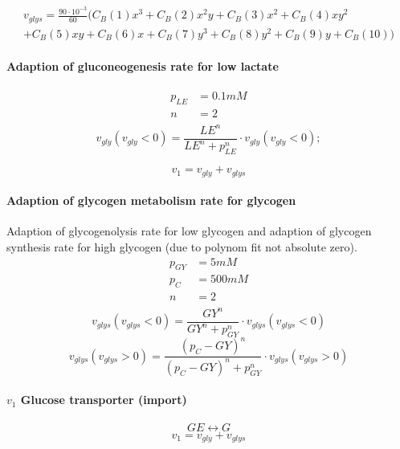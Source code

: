 \begin{landscape}
\begin{multicols}{2}
\begin{multline}
v_{glys} =\frac{90\cdot10^{-3}}{60} ( C_B(1)x^3 + C_B(2)x^2y + C_B(3)x^2 + C_B(4)xy^2\\
	  + C_B(5)xy+C_B(6)x + C_B(7)y^3 + C_B(8)y^2 + C_B(9)y + C_B(10))    
\end{multline}

\paragraph{Adaption of gluconeogenesis rate for low lactate}
\begin{align*}
p_{LE} &= 0.1 \unit{mM} \\
n  &= 2\\
\end{align*}
\begin{equation}
v_{gly}(v_{gly}<0) = \frac{LE^n}{LE^n + p_{LE}^n} \cdot v_{gly}(v_{gly}<0);
\end{equation}

\begin{equation}
v_1 = v_{gly} + v_{glys}
\label{eq: v1}
\end{equation}


\paragraph{Adaption of glycogen metabolism rate for glycogen}
Adaption of glycogenolysis rate for low glycogen and adaption of glycogen synthesis rate for high glycogen (due to polynom fit not absolute zero).
\begin{align*}
p_{GY} &= 5 \unit{mM} \\
p_{C} &= 500 \unit{mM} \\
n  &= 2\\
\end{align*}
\begin{equation}
v_{glys}(v_{glys}<0) = \frac{GY^n}{GY^n + p_{GY}^n} \cdot v_{glys}(v_{glys}<0)
\end{equation}
\begin{equation}
v_{glys}(v_{glys}>0) = \frac{(p_{C}-GY)^n}{(p_{C}-GY)^n + p_{GY}^n} \cdot v_{glys}(v_{glys}>0) 
\end{equation}


\paragraph{$v_1$ Glucose transporter (import)}
\[ GE \leftrightarrow G \]
\begin{equation}
v_1 = v_{gly} + v_{glys}
\label{eq: v1}
\end{equation}


\end{multicols}
\end{landscape}
